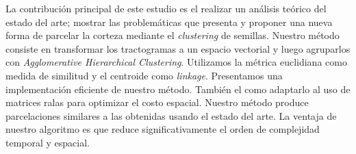 La contribuci\'on principal de este estudio es el realizar un an\'alisis
te\'orico del estado del arte; mostrar las problem\'aticas que presenta y proponer
una nueva forma de parcelar la corteza mediante el \textit{clustering} de semillas.
Nuestro m\'etodo consiste en transformar los tractogramas a un espacio vectorial
y luego agruparlos con \textit{Agglomerative Hierarchical Clustering}. Utilizamos
la m\'etrica euclidiana como medida de similitud y el centroide como \textit{linkage}.
Presentamos una implementaci\'on eficiente de nuestro m\'etodo. Tambi\'en el 
como adaptarlo al uso de matrices ralas para optimizar el costo espacial.
Nuestro m\'etodo produce parcelaciones similares a las obtenidas usando el estado
del arte. La ventaja de nuestro algoritmo es que reduce significativamente el
orden de complejidad temporal y espacial. \\

